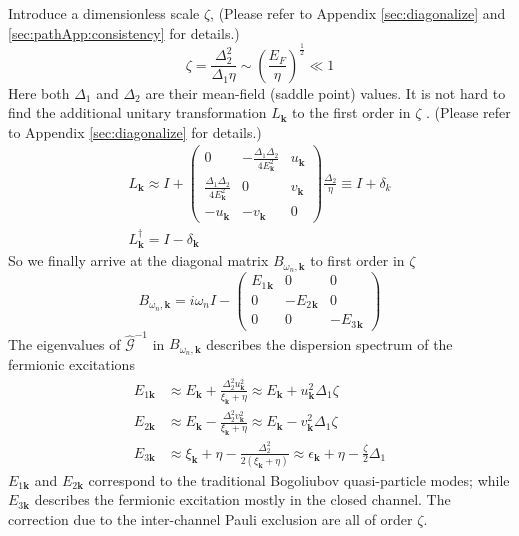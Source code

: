 \documentclass[reprint,pra]{revtex4-1}
\newcommand{\vk}{\ensuremath{\mathbf{k}}}
\newcommand{\nth}[1]{\ensuremath{\frac{1}{#1}}}
\newcommand{\br}[1]{\ensuremath{\left(#1\right)}}
\newcommand{\mtrx}[1]{\ensuremath{\begin{pmatrix}#1\end{pmatrix}}}
\newcommand{\dg}{\ensuremath{\dagger}}
\newcommand{\nG}{\ensuremath{\hat{\mathcal{G}}^{-1}}}
\begin{document}
Introduce a dimensionless scale $\zeta$, (Please refer to Appendix  \ref{sec:diagonalize} and \ref{sec:pathApp:consistency} for details.)
\begin{equation}\label{eq:pathInt2:zetaDef}
\boxed{\zeta=\frac{\Delta_{2}^{2}}{\Delta_{1}\eta}\sim\br{\frac{E_F}{\eta}}^{\nth{2}}\ll1}
\end{equation}
Here both $\Delta_{1}$ and $\Delta_{2}$ are their mean-field (saddle point) values.
It is not hard to find  the additional unitary transformation $L_{\vk}$ to the   first order in $\zeta$ . (Please refer to Appendix \ref{sec:diagonalize} for details.)
\begin{gather}\label{eq:pathInt2:L1}
L_{\vk}\approx{}I+
\mtrx{0&-\frac{\Delta_{1}{}\Delta_{2}{}}{4E^{2}_{\vk}}&u_{\vk}\\
\frac{\Delta_{1}{}\Delta_{2}{}}{4E^{2}_{\vk}}&0&v_{\vk}\\
-u_{\vk}&-v_{\vk}&0
}\frac{\Delta_{2}{}}{\eta}
\equiv{}I+\delta_{k}\\
L^{\dg}_{\vk}=I-\delta_{\vk}\nonumber
\end{gather}
So we finally arrive at the diagonal matrix $B_{\omega_{n},\vk}$ to first order in $\zeta$
\begin{equation}\label{eq:pathInt2:Bapprox}
B_{\omega_{n},\vk}=i\omega_{n}I-
	\begin{pmatrix}E_{1}{}_{\vk}&0&0\\0&-E_{2}{}_{\vk}&0\\0&0&-E_{3}{}_{\vk}\end{pmatrix}
\end{equation}
The eigenvalues of $\nG$  in $B_{\omega_{n},\vk}$ describes the dispersion spectrum of the  fermionic excitations
\begin{align}\label{eq:pathInt2:xiExpand}
E_{1\vk}&\approx{}E_{\vk}+\frac{\Delta_{2}^{2}u_{\vk}^{2}}{\xi_{\vk}+\eta}
\approx{}E_{\vk}+u_{\vk}^{2}\Delta_{1}\zeta\\
E_{2\vk}&\approx{}E_{\vk}-\frac{\Delta_{2}^{2}v_{\vk}^{2}}{\xi_{\vk}+\eta}
\approx{}E_{\vk}-v_{\vk}^{2}\Delta_{1}\zeta\label{eq:pathInt2:xiExpand2}\\
E_{3\vk}&\approx{}\xi_{\vk}+\eta-\frac{\Delta_{2}^{2}}{2(\xi_{\vk}+\eta)}
\approx{}\epsilon_{\vk}+\eta-\frac{\zeta}{2}\Delta_{1}
\label{eq:pathInt2:xiExpand3}
\end{align}
    $E_{1\vk}$ and $E_{2\vk}$ correspond to the traditional Bogoliubov quasi-particle modes; while $E_{3\vk}$ describes the fermionic excitation mostly in the closed channel.  The correction due to the inter-channel Pauli exclusion are all of order $\zeta$.
\end{document}
